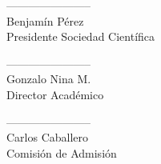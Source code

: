\documentclass[11pt,letterpaper]{report}
\begin{document}
\begin{minipage}{0.3\textwidth}
\begin{center}
-----------------------\\
Benjamín Pérez\\
Presidente Sociedad Científica\\
\end{center}
\end{minipage}
\begin{minipage}{0.9\textwidth}
\begin{center}
-----------------------\\
Gonzalo Nina M.\\
Director Académico\\
\end{center}
\end{minipage}
\vspace{1.7cm}
\begin{center}
-----------------------\\
Carlos Caballero\\
Comisión de Admisión\\
\end{center}
\end{document}

